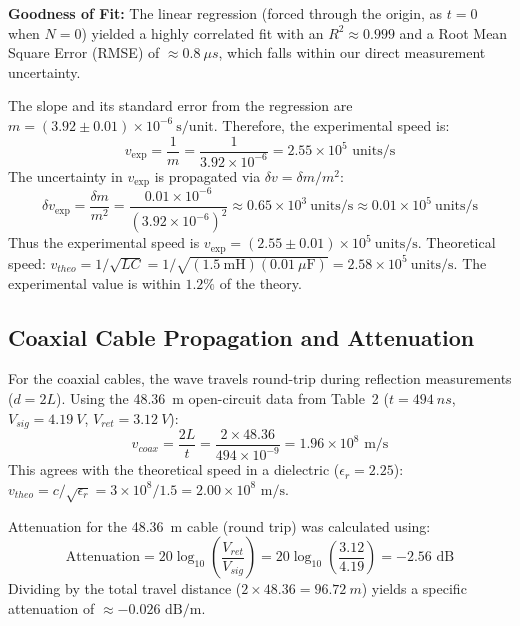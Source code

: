 \documentclass[11pt, letterpaper]{article}
\begin{document}
\textbf{Goodness of Fit:} The linear regression (forced through the origin, as $t = 0$ when $N = 0$) yielded a highly correlated fit with an $R^2 \approx 0.999$ and a Root Mean Square Error (RMSE) of $\approx \qty{0.8}{\mu s}$, which falls within our direct measurement uncertainty.

The slope and its standard error from the regression are $m = (3.92 \pm 0.01) \times 10^{-6}\ \text{s/unit}$. Therefore, the experimental speed is:
\begin{equation}
v_\text{exp} = \frac{1}{m} = \frac{1}{3.92 \times 10^{-6}} = 2.55 \times 10^5 \text{ units/s}
\end{equation}
The uncertainty in $v_\text{exp}$ is propagated via $\delta v = \delta m / m^2$:
\begin{equation}
\delta v_\text{exp} = \frac{\delta m}{m^2} = \frac{0.01 \times 10^{-6}}{{\left(3.92 \times 10^{-6}\right)}^2} \approx 0.65 \times 10^3\ \text{units/s} \approx 0.01 \times 10^5\ \text{units/s}
\end{equation}
Thus the experimental speed is $v_\text{exp} = (2.55 \pm 0.01) \times 10^5\ \text{units/s}$.
Theoretical speed: $v_{theo} = 1/\sqrt{LC} = 1/\sqrt{(1.5\ \text{mH})(0.01\ \mu\text{F})} = 2.58 \times 10^5\ \text{units/s}$. The experimental value is within $1.2\%$ of the theory.

\subsection{Coaxial Cable Propagation and Attenuation}
For the coaxial cables, the wave travels round-trip during reflection measurements ($d = 2L$). Using the \qty{48.36}{m} open-circuit data from Table~2 ($t = \qty{494}{ns}$, $V_{sig} = \qty{4.19}{V}$, $V_{ret} = \qty{3.12}{V}$):
\begin{equation}
v_{coax} = \frac{2L}{t} = \frac{2 \times 48.36}{494 \times 10^{-9}} = 1.96 \times 10^8 \text{ m/s}
\end{equation}
This agrees with the theoretical speed in a dielectric ($\epsilon_r = 2.25$):
$v_{theo} = c/\sqrt{\epsilon_r} = 3\times 10^8 / 1.5 = 2.00 \times 10^8 \text{ m/s}$.

Attenuation for the \qty{48.36}{m} cable (round trip) was calculated using:
\begin{equation}
\text{Attenuation} = 20 \log_{10}\!\left(\frac{V_{ret}}{V_{sig}}\right) = 20 \log_{10}\!\left(\frac{3.12}{4.19}\right) = -2.56 \text{ dB}
\end{equation}
Dividing by the total travel distance ($2 \times 48.36 = \qty{96.72}{m}$) yields a specific attenuation of $\approx -0.026 \text{ dB/m}$.
\end{document}
